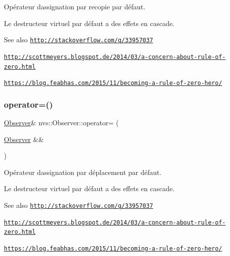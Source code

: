 Opérateur d\textquotesingle{}assignation par recopie par défaut. 

Le destructeur virtuel par défaut a des effets en cascade.

\begin{DoxySeeAlso}{See also}
\href{http://stackoverflow.com/q/33957037}{\tt http\+://stackoverflow.\+com/q/33957037} 

\href{http://scottmeyers.blogspot.de/2014/03/a-concern-about-rule-of-zero.html}{\tt http\+://scottmeyers.\+blogspot.\+de/2014/03/a-\/concern-\/about-\/rule-\/of-\/zero.\+html} 

\href{https://blog.feabhas.com/2015/11/becoming-a-rule-of-zero-hero/}{\tt https\+://blog.\+feabhas.\+com/2015/11/becoming-\/a-\/rule-\/of-\/zero-\/hero/} 
\end{DoxySeeAlso}
\mbox{\label{classnvs_1_1_observer_a12803c6d97f98c355a0f46b36a35d64b}} 
\subsubsection{\texorpdfstring{operator=()}{operator=()}\hspace{0.1cm}{\footnotesize\ttfamily [2/2]}}
{\footnotesize\ttfamily \mbox{\hyperlink{classnvs_1_1_observer}{Observer}}\& nvs\+::\+Observer\+::operator= (\begin{DoxyParamCaption}\item[{\mbox{\hyperlink{classnvs_1_1_observer}{Observer}} \&\&}]{ }\end{DoxyParamCaption})\hspace{0.3cm}{\ttfamily [default]}}



Opérateur d\textquotesingle{}assignation par déplacement par défaut. 

Le destructeur virtuel par défaut a des effets en cascade.

\begin{DoxySeeAlso}{See also}
\href{http://stackoverflow.com/q/33957037}{\tt http\+://stackoverflow.\+com/q/33957037} 

\href{http://scottmeyers.blogspot.de/2014/03/a-concern-about-rule-of-zero.html}{\tt http\+://scottmeyers.\+blogspot.\+de/2014/03/a-\/concern-\/about-\/rule-\/of-\/zero.\+html} 

\href{https://blog.feabhas.com/2015/11/becoming-a-rule-of-zero-hero/}{\tt https\+://blog.\+feabhas.\+com/2015/11/becoming-\/a-\/rule-\/of-\/zero-\/hero/} 
\end{DoxySeeAlso}
\mbox{\label{classnvs_1_1_observer_a4c0373c644180bdc48558e5248968b3a}} 
